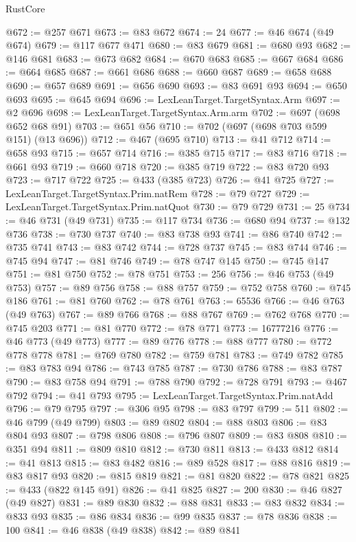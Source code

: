 \begin{lexlean}{RustCore}
\begin{coremodule}
@672 := @257 @671
@673 := @83 @672
@674 := 24
@677 := @46 @674 (@49 @674)
@679 := @117 @677 @471
@680 := @83 @679
@681 := @680 @93
@682 := @146 @681
@683 := @673 @682
@684 := @670 @683
@685 := @667 @684
@686 := @664 @685
@687 := @661 @686
@688 := @660 @687
@689 := @658 @688
@690 := @657 @689
@691 := @656 @690
@693 := @83 @691 @93
@694 := @650 @693
@695 := @645 @694
@696 := LexLeanTarget.TargetSyntax.Arm
@697 := @2 @696
@698 := LexLeanTarget.TargetSyntax.Arm.arm
@702 := @697 (@698 @652 @68 @91)
@703 := @651 @56
@710 := @702 (@697 (@698 @703 @599 @151) (@13 @696))
@712 := @467 (@695 @710)
@713 := @41 @712
@714 := @658 @93
@715 := @657 @714
@716 := @385 @715
@717 := @83 @716
@718 := @661 @93
@719 := @660 @718
@720 := @385 @719
@722 := @83 @720 @93
@723 := @717 @722
@725 := @433 (@385 @723)
@726 := @41 @725
@727 := LexLeanTarget.TargetSyntax.Prim.natRem
@728 := @79 @727
@729 := LexLeanTarget.TargetSyntax.Prim.natQuot
@730 := @79 @729
@731 := 25
@734 := @46 @731 (@49 @731)
@735 := @117 @734
@736 := @680 @94
@737 := @132 @736
@738 := @730 @737
@740 := @83 @738 @93
@741 := @86 @740
@742 := @735 @741
@743 := @83 @742
@744 := @728 @737
@745 := @83 @744
@746 := @745 @94
@747 := @81 @746
@749 := @78 @747 @145
@750 := @745 @147
@751 := @81 @750
@752 := @78 @751
@753 := 256
@756 := @46 @753 (@49 @753)
@757 := @89 @756
@758 := @88 @757
@759 := @752 @758
@760 := @745 @186
@761 := @81 @760
@762 := @78 @761
@763 := 65536
@766 := @46 @763 (@49 @763)
@767 := @89 @766
@768 := @88 @767
@769 := @762 @768
@770 := @745 @203
@771 := @81 @770
@772 := @78 @771
@773 := 16777216
@776 := @46 @773 (@49 @773)
@777 := @89 @776
@778 := @88 @777
@780 := @772 @778 @778
@781 := @769 @780
@782 := @759 @781
@783 := @749 @782
@785 := @83 @783 @94
@786 := @743 @785
@787 := @730 @786
@788 := @83 @787
@790 := @83 @758 @94
@791 := @788 @790
@792 := @728 @791
@793 := @467 @792
@794 := @41 @793
@795 := LexLeanTarget.TargetSyntax.Prim.natAdd
@796 := @79 @795
@797 := @306 @95
@798 := @83 @797
@799 := 511
@802 := @46 @799 (@49 @799)
@803 := @89 @802
@804 := @88 @803
@806 := @83 @804 @93
@807 := @798 @806
@808 := @796 @807
@809 := @83 @808
@810 := @351 @94
@811 := @809 @810
@812 := @730 @811
@813 := @433 @812
@814 := @41 @813
@815 := @83 @482
@816 := @89 @528
@817 := @88 @816
@819 := @83 @817 @93
@820 := @815 @819
@821 := @81 @820
@822 := @78 @821
@825 := @433 (@822 @145 @91)
@826 := @41 @825
@827 := 200
@830 := @46 @827 (@49 @827)
@831 := @89 @830
@832 := @88 @831
@833 := @83 @832
@834 := @833 @93
@835 := @86 @834
@836 := @99 @835
@837 := @78 @836
@838 := 100
@841 := @46 @838 (@49 @838)
@842 := @89 @841

\end{coremodule}
\end{lexlean}
